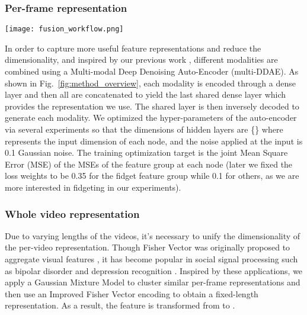 \subsubsection{Per-frame representation}
\begin{figure*}[t]
    \begin{center}
        \texttt{[image: fusion\_workflow.png]}
    \end{center}
    \caption{
    Multi-modal fusion \& classification pipeline.
    The dashed arrow represents a fully connected neural network between dense layers.
    Pose estimation, gaze, Action Units, and MFCC data are extracted from videos.
    Fidget features are computed using the method described in Section \ref{sec:method}.
    (1) All features are fed into a Multi-modal Deep Denoising Auto-Encoder (multi-DDAE) to generate a compact per-frame encoded representation.
    (2) These per-frame features are then compressed into a whole video representation using a Gaussian Mixture Model (GMM) and Fisher Vector combination.
    (3) Random Forest feature selection is performed.
    (4) Finally, a classifier predicts a given label.
    We experiment with two classifiers, a logistic regression classifier and a Multi-layer Perception.}
    \label{fig:method_overview}
\end{figure*}
In order to capture more useful feature representations and reduce the dimensionality, and inspired by our previous work \cite{zhang2020multi}, different modalities are combined using a Multi-modal Deep Denoising Auto-Encoder (multi-DDAE). As shown in Fig.~\ref{fig:method_overview}, each modality is encoded through a dense layer and then all are concatenated to yield the last shared dense layer which provides the representation we use. The shared layer is then inversely decoded to generate each modality. We optimized the hyper-parameters of the auto-encoder via several experiments so that the dimensions of hidden layers are \{\} where  represents the input dimension of each node, and the noise applied at the input is 0.1 Gaussian noise. The training optimization target is the joint Mean Square Error (MSE) of the MSEs of the feature group at each node (later we fixed the loss weights to be 0.35 for the fidget feature group while 0.1 for others, as we are more interested in fidgeting in our experiments).
\vspace{-0.2cm}
\subsubsection{Whole video representation}
Due to varying lengths of the videos, it's necessary to unify the dimensionality of the per-video representation. 
Though Fisher Vector was originally proposed to aggregate visual features \cite{perronnin2010improving}, it has become popular in social signal processing such as bipolar disorder \cite{syed2018automated} and depression recognition \cite{dhall2015temporally}.
Inspired by these applications, we apply a Gaussian Mixture Model to cluster similar per-frame representations and then use an Improved Fisher Vector encoding to obtain a fixed-length representation. As a result, the feature is transformed from  to .

